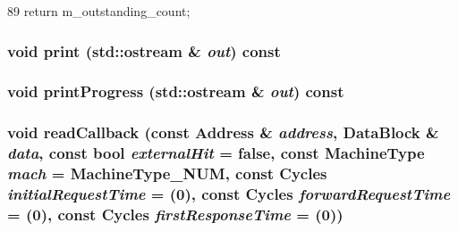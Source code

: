 \begin{DoxyCode}
89 { return m_outstanding_count; }
\end{DoxyCode}
\hypertarget{classSequencer_ac55fe386a101fbae38c716067c9966a0}{
\subsubsection[{print}]{\setlength{\rightskip}{0pt plus 5cm}void print (std::ostream \& {\em out}) const}}
\label{classSequencer_ac55fe386a101fbae38c716067c9966a0}
\hypertarget{classSequencer_a5108f0f12fa601b4c6713ee79510ef83}{
\subsubsection[{printProgress}]{\setlength{\rightskip}{0pt plus 5cm}void printProgress (std::ostream \& {\em out}) const}}
\label{classSequencer_a5108f0f12fa601b4c6713ee79510ef83}
\hypertarget{classSequencer_a6b6826ba925b0aa2cad4601dcb8dd5ee}{
\subsubsection[{readCallback}]{\setlength{\rightskip}{0pt plus 5cm}void readCallback (const {\bf Address} \& {\em address}, \/  {\bf DataBlock} \& {\em data}, \/  const bool {\em externalHit} = {\ttfamily false}, \/  const MachineType {\em mach} = {\ttfamily MachineType\_\-NUM}, \/  const {\bf Cycles} {\em initialRequestTime} = {(0)}, \/  const {\bf Cycles} {\em forwardRequestTime} = {(0)}, \/  const {\bf Cycles} {\em firstResponseTime} = {(0)})}}
\label{classSequencer_a6b6826ba925b0aa2cad4601dcb8dd5ee}



